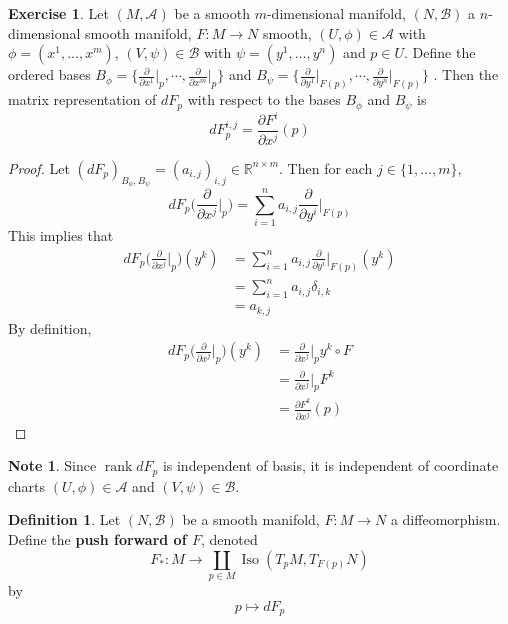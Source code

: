 \documentclass{book}
\theoremstyle{definition}
\newtheorem{defn}[definition]{Definition}
\newtheorem{note}[definition]{Note}
\newtheorem{ex}[definition]{Exercise}
\newcommand{\del}{\delta}
\newcommand{\R}{\mathbb{R}}
\newcommand{\MA}{\mathcal{A}}
\newcommand{\MB}{\mathcal{B}}
\DeclareMathOperator{\iso}{Iso}
\DeclareMathOperator{\rnk}{rank}
\DeclareMathOperator*{\0}{\mbf{0}}
\DeclareMathOperator*{\1}{\mbf{1}}
\newcommand{\p}{\partial}
\begin{document}
	\begin{ex}
		Let $(M, \MA)$ be a smooth $m$-dimensional manifold, $(N, \MB)$ a $n$-dimensional smooth manifold, $F: M \rightarrow N$ smooth, $(U, \phi) \in \MA$ with $\phi = (x^1, \dots, x^m)$, $(V, \psi) \in \MB$ with $\psi = (y^1, \dots, y^n)$  and $p \in U$. Define the ordered bases $B_\phi = \bigg \{\frac{\p}{\p x^1} \bigg|_p, \cdots, \frac{\p}{\p x^m} \bigg|_p \bigg \}$ and $B_{\psi} = \bigg \{\frac{\p}{\p y^1} \bigg|_{F(p)}, \cdots, \frac{\p}{\p y^n} \bigg|_{F(p)} \bigg \}$ .
		Then the matrix representation of $dF_p$ with respect to the bases
		$B_{\phi}$ and $B_{\psi}$ is $$ dF_p^{i,j} =  \frac{\p F^i}{\p x^j}(p)$$
	\end{ex}

	\begin{proof}
		Let $(dF_p)_{B_\phi, B_{\psi}} = (a_{i,j})_{i,j} \in \R^{n \times m}$. Then for each $j \in \{1, \dots, m\}$, $$dF_p \bigg(\frac{\p }{\p x^j} \bigg|_p\bigg) = \sum_{i=1}^n a_{i,j}\frac{\p }{\p y^i} \bigg|_{F(p)}$$
		This implies that 
		\begin{align*}
			dF_p \bigg(\frac{\p }{\p x^j} \bigg|_p\bigg) (y^k )
			&=   \sum_{i=1}^n a_{i,j}\frac{\p }{\p y^i} \bigg|_{F(p)} (y^k) \\
			&= \sum_{i=1}^n a_{i,j} \del_{i,k} \\
			&= a_{k, j}
		\end{align*}
		By definition, 
		\begin{align*}
			dF_p \bigg(\frac{\p }{\p x^j} \bigg|_p\bigg) (y^k )
			&=  \frac{\p }{\p x^j} \bigg|_p y^k \circ F \\
			&= \frac{\p }{\p x^j} \bigg|_p F^k \\
			&= \frac{\p F^k}{\p x^j} (p)
		\end{align*}
	\end{proof}
	
	
	\begin{note}
	Since $\rnk dF_p$ is independent of basis, it is independent of coordinate charts $(U, \phi) \in \MA$ and $(V, \psi) \in \MB$. 
	\end{note}	
	
	
	
	

	\newpage

	\begin{defn}
		Let $(N, \MB)$ be a smooth manifold, $F: M \rightarrow N$ a diffeomorphism. Define the \textbf{push forward of $F$}, denoted $$F_*:M \rightarrow \coprod_{p \in M} \iso(T_pM, T_{F(p)}N)$$ by $$p \mapsto dF_p$$
	\end{defn}
	
\end{document}
